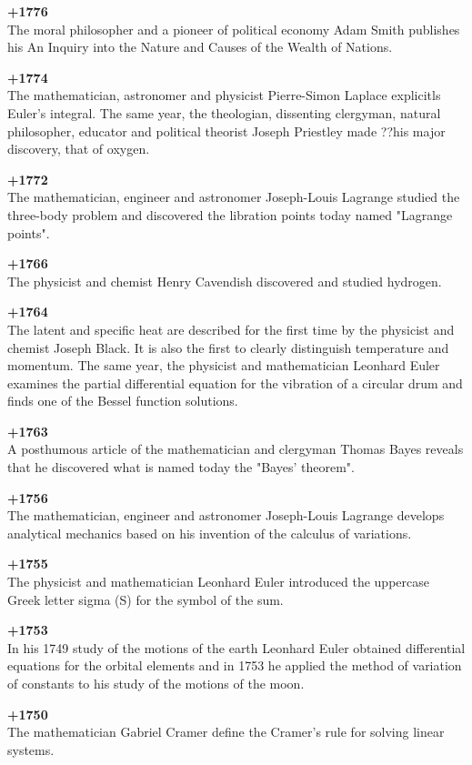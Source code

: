 \textbf{+1776}\\
The moral philosopher and a pioneer of political economy Adam Smith publishes his An Inquiry into the Nature and Causes of the Wealth of Nations.

\textbf{+1774}\\
The mathematician, astronomer and physicist Pierre-Simon Laplace explicitls Euler's integral. The same year, the theologian, dissenting clergyman, natural philosopher, educator and political theorist Joseph Priestley made ??his major discovery, that of oxygen.

\textbf{+1772}\\
The mathematician, engineer and astronomer Joseph-Louis Lagrange studied the three-body problem and discovered the libration points today named "Lagrange points".

\textbf{+1766}\\
The physicist and chemist Henry Cavendish discovered and studied hydrogen.

\textbf{+1764}\\
The latent and specific heat are described for the first time by the physicist and chemist Joseph Black. It is also the first to clearly distinguish temperature and momentum. The same year, the physicist and mathematician Leonhard Euler examines the partial differential equation for the vibration of a circular drum and finds one of the Bessel function solutions.

\textbf{+1763}\\
A posthumous article of the mathematician and clergyman Thomas Bayes reveals that he discovered what is named today the "Bayes' theorem".

\textbf{+1756}\\
The mathematician, engineer and astronomer Joseph-Louis Lagrange develops analytical mechanics based on his invention of the calculus of variations.

\textbf{+1755}\\
The physicist and mathematician Leonhard Euler introduced the uppercase Greek letter sigma (S) for the symbol of the sum.

\textbf{+1753}\\
In his 1749 study of the motions of the earth Leonhard Euler obtained differential equations for the orbital elements and in 1753 he applied the method of variation of constants to his study of the motions of the moon.

\textbf{+1750}\\
The mathematician Gabriel Cramer define the Cramer's rule for solving linear systems.

